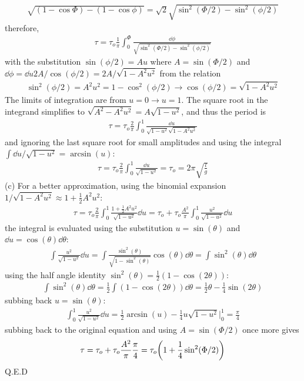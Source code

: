 \documentclass[../problems.tex]{subfiles}
\begin{document}
\begin{align*}
    \sqrt{(1-\cos\Phi) - (1-\cos\phi)} = \sqrt{2} \sqrt{\sin^2(\Phi/2) - \sin^2(\phi/2)}
\end{align*}
therefore,
\begin{align*}
    \tau = \tau_o \frac{1}{\pi} \int_0^\Phi \frac{\dd{\phi}}{\sqrt{\sin^2(\Phi/2) - \sin^2(\phi/2)}}
\end{align*}
with the substitution $\sin(\phi/2) = Au$ where $A = \sin(\Phi/2)$ and
$\dd{\phi} = \dd{u} 2A/\cos(\phi/2) = 2A/\sqrt{1-A^2 u^2}$ from the relation
\begin{align*}
    \sin^2(\phi/2) = A^2 u^2 = 1 - \cos^2(\phi/2) \to \cos(\phi/2) = \sqrt{1 - A^2 u^2}
\end{align*}
The limits of integration are from $u = 0 \to u = 1$. The square root in the integrand simplifies to
$\sqrt{A^2 - A^2u^2} = A\sqrt{1 - u^2}$, and thus the period is
\begin{align*}
    \tau = \tau_o \frac{2}{\pi} \int_0^1 \frac{\dd{u}}{\sqrt{1-u^2} \sqrt{1-A^2 u^2}}
\end{align*}
and ignoring the last square root for small amplitudes and using the integral
$\int \dd{u}/\sqrt{1-u^2} = \arcsin(u)$:
\begin{align*}
    \tau = \tau_o \frac{2}{\pi} \int_0^1 \frac{\dd{u}}{\sqrt{1-u^2}}
    = \tau_o = 2\pi \sqrt{\frac{l}{g}}
\end{align*}
(c) For a better approximation, using the binomial expansion $1/\sqrt{1-A^2 u^2} \approx
1 + \frac{1}{2} A^2 u^2$:
\begin{align*}
    \tau = \tau_o \frac{2}{\pi} \int_0^1 \frac{1 + \frac{1}{2} A^2 u^2}{\sqrt{1-u^2}} \dd{u}
    = \tau_o + \tau_o \frac{A^2}{\pi} \int_0^1 \frac{u^2}{\sqrt{1-u^2}} \dd{u}
\end{align*}
the integral is evaluated using the substitution $u = \sin(\theta)$ and $\dd{u} = \cos(\theta)
\dd{\theta}$:
\begin{align*}
    \int \frac{u^2}{\sqrt{1-u^2}} \dd{u} = \int \frac{\sin^2(\theta)}{\sqrt{1-\sin^2(\theta)}}
        \cos(\theta) \dd{\theta}
    = \int \sin^2(\theta) \dd{\theta}
\end{align*}
using the half angle identity $\sin^2(\theta) = \frac{1}{2}(1 - \cos(2\theta))$:
\begin{align*}
    \int \sin^2(\theta) \dd{\theta} = \frac{1}{2} \int (1 - \cos(2\theta)) \dd{\theta}
    = \frac{1}{2} \theta - \frac{1}{4} \sin(2\theta)
\end{align*}
subbing back $u = \sin(\theta)$:
\begin{align*}
    \int_0^1 \frac{u^2}{\sqrt{1-u^2}} \dd{u}
    = \frac{1}{2} \arcsin(u) - \frac{1}{4} u \sqrt{1-u^2} \Big|_0^1 = \frac{\pi}{4}
\end{align*}
subbing back to the original equation and using $A = \sin(\Phi/2)$ once more gives
\begin{align*}
    \tau = \tau_o + \tau_o \frac{A^2}{\pi} \frac{\pi}{4} 
    = \tau_o \quantity(1 + \frac{1}{4} \sin^2(\Phi/2))
\end{align*}
Q.E.D
\end{document}
